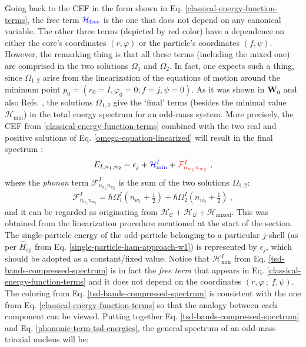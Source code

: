 Going back to the CEF in the form shown in Eq. \ref{classical-energy-function-terms}, the free term ${\color{blue}\mathcal{H}_\text{free}}$ is the one that does not depend on any canonical variable. The other three terms (depicted by red color) have a dependence on either the core's coordinates $(r,\varphi)$ or the particle's coordinates $(f,\psi)$. However, the remarking thing is that all these terms (including the mixed one) are comprised in the two solutions $\Omega_1$ and $\Omega_2$. In fact, one expects such a thing, since $\Omega_{1,2}$ arise from the linearization of the equations of motion around the minimum point $p_0=(r_0=I,\varphi_0=0;f=j,\psi=0)$. As it was shown in $\mathbf{W_0}$ and also Refs. \cite{raduta2020approach,raduta2020new}, the solutions $\Omega_{1,2}$ give the `final' terms (besides the minimal value $\mathcal{H}_\text{min}$) in the total energy spectrum for an odd-mass system. More precisely, the CEF from \ref{classical-energy-function-terms} combined with the two real and positive solutions of Eq. \ref{omega-equation-linearized} will result in the final spectrum \cite{poenaru2021extensive1}:
\begin{align}
    E_{I,n_1,n_2}=\epsilon_j+{\color{blue}\mathcal{H}_\text{min}^I}+{\color{red}\mathcal{F}^I_{n_{w_1}n_{w_2}}}\ ,
    \label{tsd-bands-compressed-spectrum}
\end{align}
where the \emph{phonon} term $\mathcal{F}_{n_{w_1}n_{w_2}}^I$ is the sum of the two solutions $\Omega_{1,2}$:
\begin{align}
    \mathcal{F}_{n_{w_1}n_{w_2}}^I=\hbar\Omega_1^I\left(n_{w_1}+\frac{1}{2}\right)+\hbar\Omega_2^I\left(n_{w_2}+\frac{1}{2}\right)\ ,
    \label{phononic-term-tsd-energies}
\end{align}
and it can be regarded as originating from $\mathcal{H}_\mathscr{C}+\mathcal{H}_\mathcal{Q}+\mathcal{H}_\text{mixed}$. This was obtained from the linearization procedure mentioned at the start of the section. The single-particle energy of the odd-particle belonging to a particular $j$-shell (as per $\hat{H}_\text{sp}$ from Eq. \ref{single-particle-ham-approach-w1}) is represented by $\epsilon_j$, which should be adopted as a constant/fixed value. Notice that $\mathcal{H}_\text{min}^I$ from Eq. \ref{tsd-bands-compressed-spectrum} is in fact the \emph{free term} that appears in Eq. \ref{classical-energy-function-terms} and it does not depend on the coordinates $(r, \varphi\ ;\ f, \psi)$. The coloring from Eq. \ref{tsd-bands-compressed-spectrum} is consistent with the one from Eq. \ref{classical-energy-function-terms} so that the analogy between each component can be viewed. Putting together Eq. \ref{tsd-bands-compressed-spectrum} and Eq. \ref{phononic-term-tsd-energies}, the general spectrum of an odd-mass triaxial nucleus will be:
